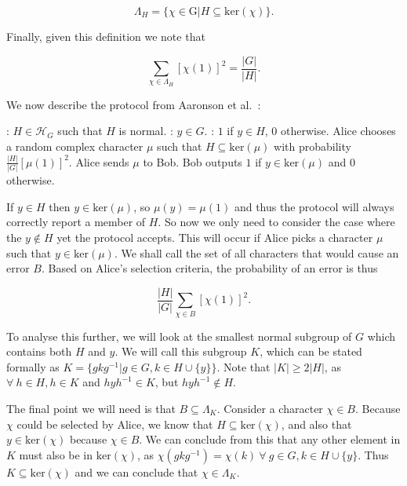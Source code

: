 \documentclass[a4paper]{article}
\begin{document}
        $$\Lambda_H = \{\chi \in \textrm{G}|H\subseteq \textrm{ker}(\chi)\}.$$

        Finally, given this definition we note that

        $$\sum_{\chi \in \Lambda_H}[\chi(1)]^2 = \frac{|G|}{|H|}.$$

        We now describe the protocol from Aaronson et al.~\cite{0902.3175}:

        \begin{codebox}
            \zi {}: $H \in \mathscr{H}_G$ such that $H$ is normal.
            \zi {}: $y \in G$.
            \zi {}: $1$ if $y \in H$, $0$ otherwise.
            \li Alice chooses a random complex character $\mu$ such that $H \subseteq \textrm{ker}(\mu)$ with probability $\frac{|H|}{|G|}[\mu(1)]^2$.
            \li Alice sends $\mu$ to Bob.
            \li Bob outputs $1$ if $y \in \textrm{ker}(\mu)$ and $0$ otherwise.
        \end{codebox}

        If $y \in H$ then $y \in \textrm{ker}(\mu)$, so $\mu(y) = \mu(1)$ and thus the protocol will always correctly report a member of $H$. So now we only need to consider the case where the $y \notin H$ yet the protocol accepts. This will occur if Alice picks a character $\mu$ such that $y \in \textrm{ker}(\mu)$. We shall call the set of all characters that would cause an error $B$. Based on Alice's selection criteria, the probability of an error is thus

        $$\frac{|H|}{|G|}\sum_{\chi \in B}[\chi(1)]^2.$$

        To analyse this further, we will look at the smallest normal subgroup of $G$ which contains both $H$ and $y$. We will call this subgroup $K$, which can be stated formally as $K = \{gkg^{-1}|g \in G, k \in H \cup \{y\}\}$. Note that $|K| \geq 2|H|$, as $\forall~h\in H, h \in K$ and $hyh^{-1} \in K$, but $hyh^{-1} \notin H$.

        The final point we will need is that $B \subseteq \Lambda_K$. Consider a character $\chi \in B$. Because $\chi$ could be selected by Alice, we know that $H \subseteq \textrm{ker}(\chi)$, and also that $y \in \textrm{ker}(\chi)$ because $\chi \in B$. We can conclude from this that any other element in $K$ must also be in $\textrm{ker}(\chi)$, as $\chi(gkg^{-1}) = \chi(k)~\forall~g\in G, k\in H \cup \{y\}$. Thus $K \subseteq \textrm{ker}(\chi)$ and we can conclude that $\chi \in \Lambda_K$.
\end{document}
